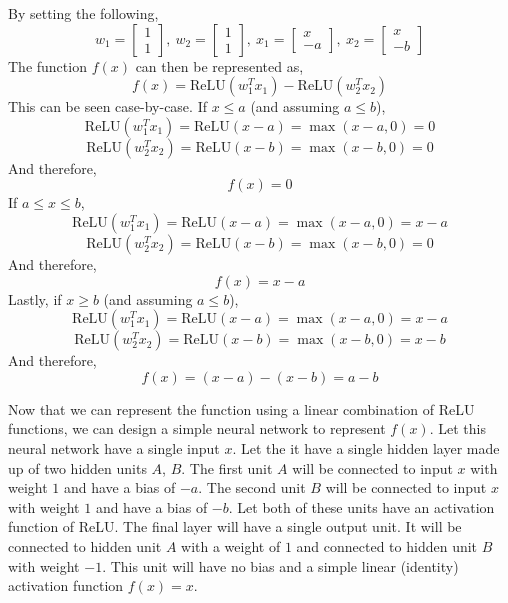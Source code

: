 \documentclass[12pt,twoside]{article}
\begin{document}
\begin{problems}
\begin{problemparts}
\problempart %

By setting the following,
$$ w_1 = \begin{bmatrix}
    1 \\
    1
\end{bmatrix},\ w_2 = \begin{bmatrix}
    1 \\
    1
\end{bmatrix},\ x_1 = \begin{bmatrix}
    x \\
    -a
\end{bmatrix},\ x_2 = \begin{bmatrix}
    x \\
    -b
\end{bmatrix} $$
The function $f(x)$ can then be represented as,
$$ f(x) = \mathrm{ReLU} (w_1^T x_1) - \mathrm{ReLU} (w_2^T x_2) $$
This can be seen case-by-case. If $x \leq a$ (and assuming $a \leq b$),
$$ \mathrm{ReLU}(w_1^T x_1) = \mathrm{ReLU} (x - a) = \max (x - a, 0) = 0 $$
$$ \mathrm{ReLU}(w_2^T x_2) = \mathrm{ReLU} (x - b) = \max (x - b, 0) = 0 $$
And therefore,
$$ f(x) = 0$$
If $a \leq x \leq b$,
$$ \mathrm{ReLU}(w_1^T x_1) = \mathrm{ReLU} (x - a) = \max (x - a, 0) = x - a $$
$$ \mathrm{ReLU}(w_2^T x_2) = \mathrm{ReLU} (x - b) = \max (x - b, 0) = 0 $$
And therefore,
$$ f(x) = x - a $$
Lastly, if $x \geq b$ (and assuming $a \leq b$),
$$ \mathrm{ReLU}(w_1^T x_1) = \mathrm{ReLU} (x - a) = \max (x - a, 0) = x - a $$
$$ \mathrm{ReLU}(w_2^T x_2) = \mathrm{ReLU} (x - b) = \max (x - b, 0) = x - b $$
And therefore,
$$ f(x) = (x - a) - (x - b) = a - b $$

\problempart %

Now that we can represent the function using a linear combination of ReLU
functions, we can design a simple neural network to represent $f(x)$. Let
this neural network have a single input $x$. Let the it have a single hidden
layer made up of two hidden units $A$, $B$. The first unit $A$ will be
connected to input $x$ with weight $1$ and have a bias of $-a$. The second
unit $B$ will be connected to input $x$ with weight $1$ and have a bias of
$-b$. Let both of these units have an activation function of ReLU. The final
layer will have a single output unit. It will be connected to hidden unit $A$
with a weight of $1$ and connected to hidden unit $B$ with weight $-1$. This
unit will have no bias and a simple linear (identity) activation function
$f(x) = x$.


\end{problemparts}
\end{problems}
\end{document}
